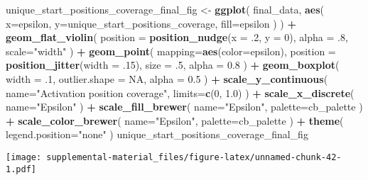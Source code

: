 \documentclass[]{book}
\newenvironment{Shaded}{\begin{snugshade}}{\end{snugshade}}
\newcommand{\DataTypeTok}[1]{\textcolor[rgb]{0.13,0.29,0.53}{#1}}
\newcommand{\DecValTok}[1]{\textcolor[rgb]{0.00,0.00,0.81}{#1}}
\newcommand{\FloatTok}[1]{\textcolor[rgb]{0.00,0.00,0.81}{#1}}
\newcommand{\KeywordTok}[1]{\textcolor[rgb]{0.13,0.29,0.53}{\textbf{#1}}}
\newcommand{\NormalTok}[1]{#1}
\newcommand{\OperatorTok}[1]{\textcolor[rgb]{0.81,0.36,0.00}{\textbf{#1}}}
\newcommand{\OtherTok}[1]{\textcolor[rgb]{0.56,0.35,0.01}{#1}}
\newcommand{\StringTok}[1]{\textcolor[rgb]{0.31,0.60,0.02}{#1}}
\begin{document}
\begin{Shaded}
\begin{Highlighting}[]
\NormalTok{unique_start_positions_coverage_final_fig <-}\StringTok{ }\KeywordTok{ggplot}\NormalTok{(}
\NormalTok{    final_data,}
    \KeywordTok{aes}\NormalTok{(}
      \DataTypeTok{x=}\NormalTok{epsilon,}
      \DataTypeTok{y=}\NormalTok{unique_start_positions_coverage,}
      \DataTypeTok{fill=}\NormalTok{epsilon}
\NormalTok{    )}
\NormalTok{  ) }\OperatorTok{+}
\StringTok{  }\KeywordTok{geom_flat_violin}\NormalTok{(}
    \DataTypeTok{position =} \KeywordTok{position_nudge}\NormalTok{(}\DataTypeTok{x =} \FloatTok{.2}\NormalTok{, }\DataTypeTok{y =} \DecValTok{0}\NormalTok{),}
    \DataTypeTok{alpha =} \FloatTok{.8}\NormalTok{,}
    \DataTypeTok{scale=}\StringTok{"width"}
\NormalTok{  ) }\OperatorTok{+}
\StringTok{  }\KeywordTok{geom_point}\NormalTok{(}
    \DataTypeTok{mapping=}\KeywordTok{aes}\NormalTok{(}\DataTypeTok{color=}\NormalTok{epsilon),}
    \DataTypeTok{position =} \KeywordTok{position_jitter}\NormalTok{(}\DataTypeTok{width =} \FloatTok{.15}\NormalTok{),}
    \DataTypeTok{size =} \FloatTok{.5}\NormalTok{,}
    \DataTypeTok{alpha =} \FloatTok{0.8}
\NormalTok{  ) }\OperatorTok{+}
\StringTok{  }\KeywordTok{geom_boxplot}\NormalTok{(}
    \DataTypeTok{width =} \FloatTok{.1}\NormalTok{,}
    \DataTypeTok{outlier.shape =} \OtherTok{NA}\NormalTok{,}
    \DataTypeTok{alpha =} \FloatTok{0.5}
\NormalTok{  ) }\OperatorTok{+}
\StringTok{  }\KeywordTok{scale_y_continuous}\NormalTok{(}
    \DataTypeTok{name=}\StringTok{"Activation position coverage"}\NormalTok{,}
    \DataTypeTok{limits=}\KeywordTok{c}\NormalTok{(}\DecValTok{0}\NormalTok{, }\FloatTok{1.0}\NormalTok{)}
\NormalTok{  ) }\OperatorTok{+}
\StringTok{  }\KeywordTok{scale_x_discrete}\NormalTok{(}
    \DataTypeTok{name=}\StringTok{"Epsilon"}
\NormalTok{  ) }\OperatorTok{+}
\StringTok{  }\KeywordTok{scale_fill_brewer}\NormalTok{(}
    \DataTypeTok{name=}\StringTok{"Epsilon"}\NormalTok{,}
    \DataTypeTok{palette=}\NormalTok{cb_palette}
\NormalTok{  ) }\OperatorTok{+}
\StringTok{  }\KeywordTok{scale_color_brewer}\NormalTok{(}
    \DataTypeTok{name=}\StringTok{"Epsilon"}\NormalTok{,}
    \DataTypeTok{palette=}\NormalTok{cb_palette}
\NormalTok{  ) }\OperatorTok{+}
\StringTok{  }\KeywordTok{theme}\NormalTok{(}
    \DataTypeTok{legend.position=}\StringTok{"none"}
\NormalTok{  )}
\NormalTok{unique_start_positions_coverage_final_fig}
\end{Highlighting}
\end{Shaded}

\texttt{[image: supplemental-material\_files/figure-latex/unnamed-chunk-42-1.pdf]}
\end{document}
